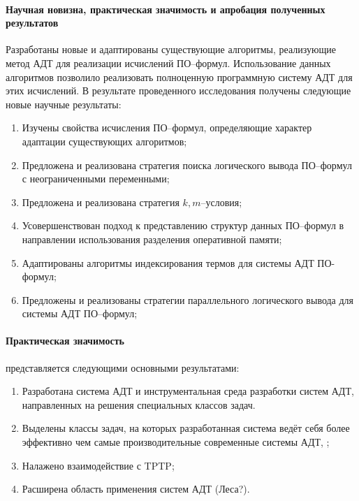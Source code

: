 \paragraph{Научная новизна, практическая значимость и апробация полученных результатов}
Разработаны новые и адаптированы существующие алгоритмы, реализующие метод АДТ для реализации исчислений ПО--формул. Использование данных алгоритмов позволило реализовать полноценную программную систему АДТ для этих исчислений. В результате проведенного исследования получены следующие новые научные результаты:
\begin{enumerate}
\item Изучены свойства исчисления ПО--формул, определяющие характер адаптации существующих алгоритмов;
\item Предложена и реализована стратегия поиска логического вывода ПО--формул с неограниченными переменными;
\item Предложена и реализована стратегия $k,m$--условия;
\item Усовершенствован подход к представлению структур данных ПО--формул в направлении использования разделения оперативной памяти;
\item Адаптированы алгоритмы индексирования термов для системы АДТ ПО-формул;
\item Предложены и реализованы стратегии параллельного логического вывода для системы АДТ ПО--формул;
\end{enumerate}

\paragraph{Практическая значимость}\hspace{-1em} представляется следующими основными результатами:
\begin{enumerate}
\item Разработана система АДТ и инструментальная среда разработки систем АДТ, направленных на решения специальных классов задач.
\item Выделены классы задач, на которых разработанная система ведёт себя более эффективно чем самые производительные современные системы АДТ, ;
\item Налажено взаимодействие с TPTP; %
\item Расширена область применения систем АДТ (Леса?).
\end{enumerate}



